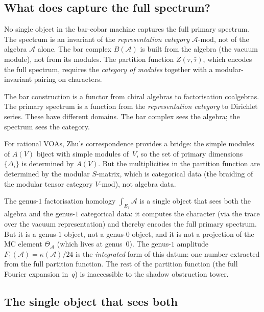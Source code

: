 \documentclass[11pt]{article}
\newcommand{\cA}{\mathcal{A}}
\begin{document}
\subsection{What does capture the full spectrum?}

No single object in the bar-cobar machine captures the full
primary spectrum.  The spectrum is an invariant of the
\emph{representation category} $\cA\text{-}\mathrm{mod}$, not
of the algebra $\cA$ alone.  The bar complex $B(\cA)$ is built
from the algebra (the vacuum module), not from its modules.  The
partition function $Z(\tau,\bar\tau)$, which encodes the full
spectrum, requires the \emph{category of modules} together with
a modular-invariant pairing on characters.

\begin{observation}
\label{obs:categorical-gap}
The bar construction is a functor from chiral algebras to
factorisation coalgebras.  The primary spectrum is a function
from the \emph{representation category} to Dirichlet series.
These have different domains.  The bar complex sees the
algebra; the spectrum sees the category.

For rational VOAs, Zhu's correspondence provides a bridge:
the simple modules of $A(V)$ biject with simple modules
of~$V$, so the set of primary dimensions~$\{\Delta_i\}$ is
determined by $A(V)$.  But the multiplicities in the partition
function are determined by the modular $S$-matrix, which is
categorical data (the braiding of the modular tensor category
$V\text{-}\mathrm{mod}$), not algebra data.
\end{observation}

The genus-$1$ factorisation homology $\int_{E_\tau} \cA$
is a single object that sees both the algebra and the genus-$1$
categorical data: it computes the character (via the trace over
the vacuum representation) and thereby encodes the full
primary spectrum.  But it is a genus-$1$ object, not a genus-$0$
object, and it is not a projection of the MC element
$\Theta_\cA$ (which lives at genus~$0$).  The genus-$1$
amplitude $F_1(\cA) = \kappa(\cA)/24$ is the \emph{integrated}
form of this datum: one number extracted from the full partition
function.  The rest of the partition function (the full Fourier
expansion in~$q$) is inaccessible to the shadow obstruction tower.

\subsection{The single object that sees both}
\end{document}
